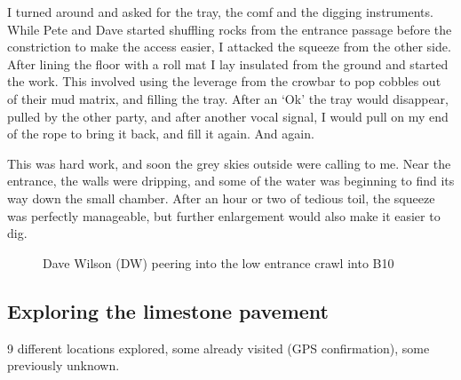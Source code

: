 I turned around and asked for the tray, the comf and the digging instruments. While Pete and Dave started shuffling rocks from the entrance passage before the constriction to make the access easier, I attacked the squeeze from the other side. After lining the floor with a roll mat I lay insulated from the ground and started the work. This involved using the leverage from the crowbar to pop cobbles out of their mud matrix, and filling the tray. After an `Ok' the tray would disappear, pulled by the other party, and after another vocal signal, I would pull on my end of the rope to bring it back, and fill it again. And again.

This was hard work, and soon the grey skies outside were calling to me. Near the entrance, the walls were dripping, and some of the water was beginning to find its way down the small chamber. After an hour or two of tedious toil, the squeeze was perfectly manageable, but further enlargement would also make it easier to dig.

\begin{figure*}[t!]
	\checkoddpage \ifoddpage \forcerectofloat \else \forceversofloat \fi
	\centering
	\label{dw jailbreak}
	\caption{Dave Wilson (DW) peering into the low entrance crawl into B10 }
\end{figure*}


\subsection{Exploring the limestone pavement}
\label{sec:limestone pavement}
9 different locations explored, some already visited (GPS confirmation), some previously unknown.


